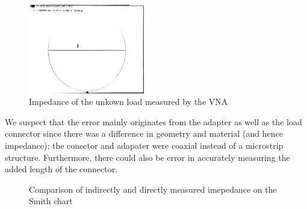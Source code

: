 \documentclass[10pt]{article}
\begin{document}
\begin{figure}[ht]
  \centering
  \includegraphics[width=0.45\textwidth]{../photos/lab2/unkwn-load.jpg}
  \caption{Impedance of the unkown load measured by the VNA\vspace{-0.2cm}}
  \label{tline_matching_z_0}
\end{figure}

We suspect that the error mainly originates from the adapter as well as the load connector since there was a difference in geometry and material (and hence impedance); 
the conector and adapater were coaxial instead of a microstrip structure. Furthermore, there could also be error in accurately measuring the added length of the 
connector.

\begin{figure}[ht]
  \centering
  \caption{Comparison of indirectly and directly measured imepedance on the Smith chart}
\end{figure}
\end{document}
